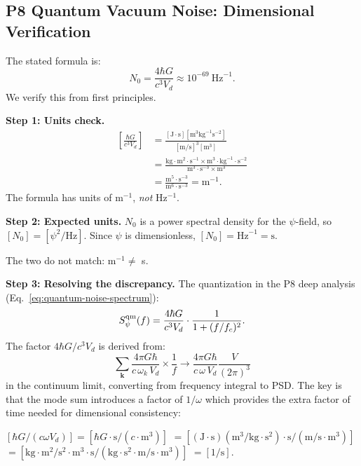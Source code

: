 \documentclass[aps,prd,twocolumn,superscriptaddress,nofootinbib]{revtex4-2}
\begin{document}
\subsection{P8 Quantum Vacuum Noise: Dimensional Verification}
\label{sec:noise_check}

The stated formula is:
\begin{equation}
N_0 = \frac{4\hbar G}{c^3 V_d} \approx 10^{-69}~\text{Hz}^{-1}.
\label{eq:N0_stated}
\end{equation}
We verify this from first principles.

\textbf{Step 1: Units check.}
\begin{align}
\left[\frac{\hbar G}{c^3 V_d}\right]
&= \frac{[\text{J}\cdot\text{s}][\text{m}^3\text{kg}^{-1}\text{s}^{-2}]}
{[\text{m/s}]^3[\text{m}^3]} \nonumber\\
&= \frac{\text{kg}\cdot\text{m}^2\cdot\text{s}^{-1}\times\text{m}^3\cdot\text{kg}^{-1}\cdot\text{s}^{-2}}
{\text{m}^3\cdot\text{s}^{-3}\times\text{m}^3} \nonumber\\
&= \frac{\text{m}^5\cdot\text{s}^{-3}}{\text{m}^6\cdot\text{s}^{-3}}
= \text{m}^{-1}.
\end{align}
The formula has units of m$^{-1}$, \emph{not} Hz$^{-1}$.

\textbf{Step 2: Expected units.}
$N_0$ is a power spectral density for the $\psi$-field, so
$[N_0] = [\psi^2/\text{Hz}]$.  Since $\psi$ is dimensionless,
$[N_0] = \text{Hz}^{-1} = \text{s}$.

The two do not match: m$^{-1} \neq$ s.

\textbf{Step 3: Resolving the discrepancy.}
The quantization in the P8 deep analysis (Eq.~\eqref{eq:quantum-noise-spectrum}):
\begin{equation}
S_\psi^{\rm qm}(f) = \frac{4\hbar G}{c^3 V_d}\cdot\frac{1}{1+(f/f_c)^2}.
\end{equation}
The factor $4\hbar G/c^3 V_d$ is derived from:
\begin{equation}
\sum_\mathbf{k}\frac{4\pi G\hbar}{c\,\omega_k\,V_d}
\times\frac{1}{f}\to\frac{4\pi G\hbar}{c\,\omega\,V_d}\frac{V}{(2\pi)^3}
\end{equation}
in the continuum limit, converting from frequency integral to PSD.
The key is that the mode sum introduces a factor of $1/\omega$ which provides
the extra factor of time needed for dimensional consistency:

$[\hbar G/(c\omega V_d)] = [\hbar G\cdot\text{s}/(c\cdot\text{m}^3)]$
$= [(\text{J}\cdot\text{s})(\text{m}^3/\text{kg}\cdot\text{s}^2)\cdot\text{s}/(\text{m/s}\cdot\text{m}^3)]$
$= [\text{kg}\cdot\text{m}^2/\text{s}^2\cdot\text{m}^3\cdot\text{s}/(\text{kg}\cdot\text{s}^2\cdot\text{m/s}\cdot\text{m}^3)]$
$= [1/\text{s}]$.
\end{document}
